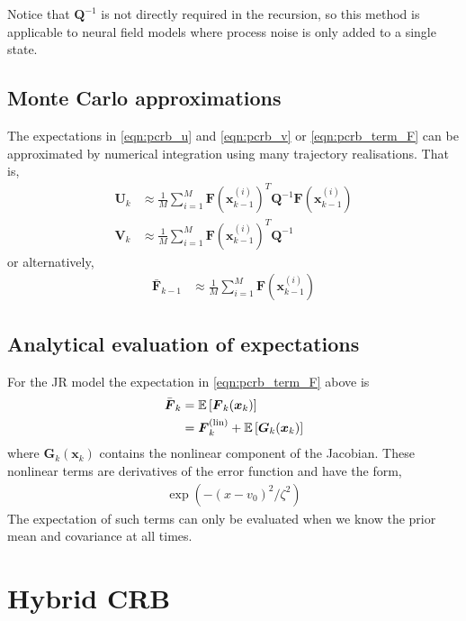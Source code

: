 \documentclass{article}
\renewcommand{\vec}[1]{\ensuremath{{\boldsymbol #1}}}
\newcommand{\mat}[1]{\ensuremath{\boldsymbol{#1}}}
\begin{document}
Notice that $\mat Q^{-1}$ is not directly required in the recursion, so this method is applicable to neural field models where process noise is only added to a single state.

\subsection{Monte Carlo approximations}

The expectations in \eqref{eqn:pcrb_u} and \eqref{eqn:pcrb_v} or \eqref{eqn:pcrb_term_F} can be approximated by numerical integration using many trajectory realisations. That is,
\begin{align}
	\mat U_k &\approx \frac{1}{M}\sum_{i=1}^M \mat F(\vec x_{k-1}^{(i)})^T\mat Q^{-1} \mat F(\vec x_{k-1}^{(i)}) \\
	\mat V_k &\approx \frac{1}{M}\sum_{i=1}^M \mat F(\vec x_{k-1}^{(i)})^T\mat Q^{-1}  
\end{align}
or alternatively,
\begin{align}
	\bar{\mat F}_{k-1} &\approx \frac{1}{M}\sum_{i=1}^M \mat F(\vec x_{k-1}^{(i)})
\end{align}

\subsection{Analytical evaluation of expectations}

For the JR model the expectation in \eqref{eqn:pcrb_term_F} above is
\begin{align}
	\bar{\mat F}_k &= \mathbb E\left[ \mat F_k(\vec x_k)\right] \\
	&= \mat F_k^{\rm (lin)} + \mathbb E\left[ \mat G_k(\vec x_k)\right] 
\end{align}
where $\mat G_k(\vec x_k)$ contains the nonlinear component of the Jacobian. These nonlinear terms are derivatives of the error function and have the form,
\begin{align}
	\exp(-(x-v_0)^2/\zeta^2)
\end{align}
The expectation of such terms can only be evaluated when we know the prior mean and covariance at all times.

\section{Hybrid CRB}
\end{document}
